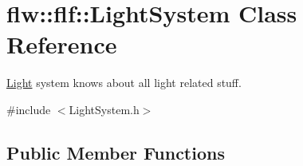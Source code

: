 \hypertarget{classflw_1_1flf_1_1LightSystem}{}\section{flw\+:\+:flf\+:\+:Light\+System Class Reference}
\label{classflw_1_1flf_1_1LightSystem}


\hyperlink{classflw_1_1flf_1_1Light}{Light} system knows about all light related stuff.  




{\ttfamily \#include $<$Light\+System.\+h$>$}

\subsection*{Public Member Functions}
